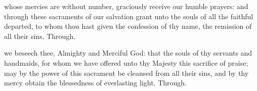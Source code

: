 \secret
{} whose mercies are without number, graciously receive our humble prayers: and through these sacraments of our salvation grant unto the souls of all the faithful departed, to whom thou hast given the confession of thy name, the remission of all their sins. Through.


\postcommunion
{} we beseech thee, Almighty and Merciful God: that the souls of thy servants and handmaids, for whom we have offered unto thy Majesty this sacrifice of praise; may by the power of this sacrament be cleansed from all their sins, and by thy mercy obtain the blessedness of everlasting light. Through.

